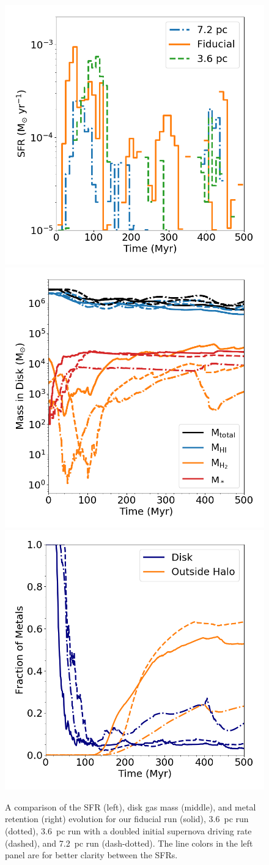 \begin{figure}
\centering
\includegraphics[width=0.475\linewidth]{figures/ch1/sfr_resolution_study.png}
\includegraphics[width=0.475\linewidth]{figures/ch1/mass_evolution_resolution.png}\\
\includegraphics[width=0.475\linewidth]{figures/ch1/metal_retention_resolution.png}
\caption{A comparison of the SFR (left), disk gas mass (middle), and metal retention (right) evolution for our fiducial run (solid), 3.6~pc run (dotted), 3.6~pc run with a doubled initial supernova driving rate (dashed), and 7.2~pc run (dash-dotted). The line colors in the left panel are for better clarity between the SFRs.}
\label{ch1:fig:resolution_study}
\end{figure}

